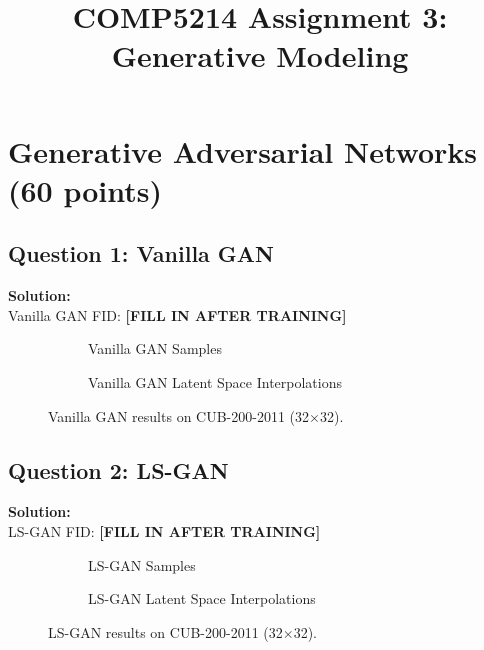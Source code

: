 \documentclass[11pt]{article}
\title{COMP5214 Assignment 3: Generative Modeling}
\author{}
\date{}
\begin{document}
\maketitle

\section{Generative Adversarial Networks (60 points)}

\subsection*{Question 1: Vanilla GAN}

\textbf{Solution:}\\
Vanilla GAN FID: \textbf{[FILL IN AFTER TRAINING]}

\begin{figure}[H]
  \centering
  \begin{subfigure}[b]{0.48\textwidth}
    \centering
    \fbox{\rule{0pt}{4cm}\rule{0.9\textwidth}{0pt}}
    \caption{Vanilla GAN Samples}
  \end{subfigure}
  \hfill
  \begin{subfigure}[b]{0.48\textwidth}
    \centering
    \fbox{\rule{0pt}{4cm}\rule{0.9\textwidth}{0pt}}
    \caption{Vanilla GAN Latent Space Interpolations}
  \end{subfigure}
  \caption{Vanilla GAN results on CUB-200-2011 (32$\times$32).}
\end{figure}

\subsection*{Question 2: LS-GAN}

\textbf{Solution:}\\
LS-GAN FID: \textbf{[FILL IN AFTER TRAINING]}

\begin{figure}[H]
  \centering
  \begin{subfigure}[b]{0.48\textwidth}
    \centering
    \fbox{\rule{0pt}{4cm}\rule{0.9\textwidth}{0pt}}
    \caption{LS-GAN Samples}
  \end{subfigure}
  \hfill
  \begin{subfigure}[b]{0.48\textwidth}
    \centering
    \fbox{\rule{0pt}{4cm}\rule{0.9\textwidth}{0pt}}
    \caption{LS-GAN Latent Space Interpolations}
  \end{subfigure}
  \caption{LS-GAN results on CUB-200-2011 (32$\times$32).}
\end{figure}
\end{document}
